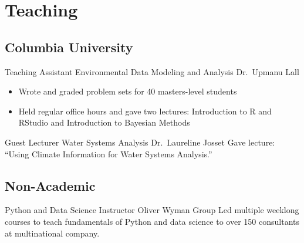 \section{Teaching}

\subsection{Columbia University}

{Teaching Assistant}
{Environmental Data Modeling and Analysis}
{Dr.~Upmanu Lall}
{}
{
	\begin{itemize}
		\item Wrote and graded problem sets for 40 masters-level students
		\item Held regular office hours and gave two lectures: Introduction to R and RStudio and Introduction to Bayesian Methods
	\end{itemize}
}

{Guest Lecturer}
{Water Systems Analysis}
{Dr.~Laureline Josset}
{}
{Gave lecture: ``Using Climate Information for Water Systems Analysis.''}

\subsection{Non-Academic}

{Python and Data Science Instructor}
{Oliver Wyman Group}
{}
{}
{Led multiple weeklong courses to teach fundamentals of Python and data science to over 150 consultants at multinational company.}
